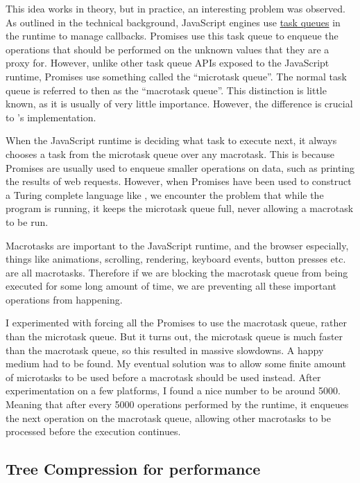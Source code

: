 This idea works in theory, but in practice, an interesting problem was observed. As outlined in the technical background, JavaScript engines use \hyperref[background:task-queues]{task queues} in the runtime to manage callbacks. Promises use this task queue to enqueue the operations that should be performed on the unknown values that they are a proxy for. However, unlike other task queue APIs exposed to the JavaScript runtime, Promises use something called the ``microtask queue''. The normal task queue is referred to then as the ``macrotask queue''. This distinction is little known, as it is usually of very little importance. However, the difference is crucial to \Setanta{}'s implementation.

When the JavaScript runtime is deciding what task to execute next, it always chooses a task from the microtask queue over any macrotask. This is because Promises are usually used to enqueue smaller operations on data, such as printing the results of web requests. However, when Promises have been used to construct a Turing complete language like \Setanta{}, we encounter the problem that while the program is running, it keeps the microtask queue full, never allowing a macrotask to be run. 

Macrotasks are important to the JavaScript runtime, and the browser especially, things like animations, scrolling, rendering, keyboard events, button presses etc. are all macrotasks. Therefore if we are blocking the macrotask queue from being executed for some long amount of time, we are preventing all these important operations from happening.

I experimented with forcing all the Promises to use the macrotask queue, rather than the microtask queue. But it turns out, the microtask queue is much faster than the macrotask queue, so this resulted in massive slowdowns. A happy medium had to be found.
My eventual solution was to allow some finite amount of microtasks to be used before a macrotask should be used instead. After experimentation on a few platforms, I found a nice number to be around 5000. Meaning that after every 5000 operations performed by the \Setanta{} runtime, it enqueues the next operation on the macrotask queue, allowing other macrotasks to be processed before the execution continues.

\subsection{Tree Compression for performance}
\label{solution:treecompression}

